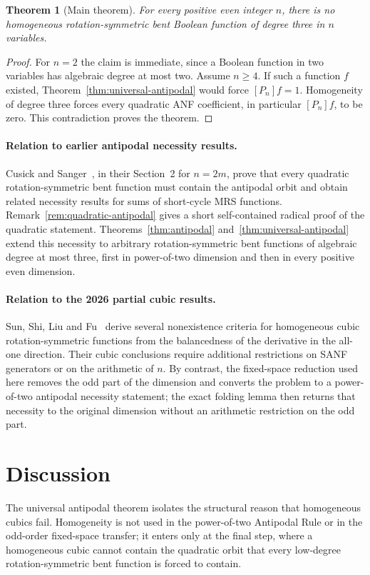 \documentclass[11pt,a4paper]{article}
\newtheorem{theorem}{Theorem}[section]
\theoremstyle{remark}
\theoremstyle{plain}
\begin{document}
\begin{theorem}[Main theorem]\label{thm:global}
For every positive even integer $n$, there is no homogeneous rotation-symmetric bent Boolean function of degree three in $n$ variables.
\end{theorem}
\begin{proof}
For $n=2$ the claim is immediate, since a Boolean function in two variables has algebraic degree at most two. Assume $n\ge4$. If such a function $f$ existed, Theorem~\ref{thm:universal-antipodal} would force $[P_n]f=1$. Homogeneity of degree three forces every quadratic ANF coefficient, in particular $[P_n]f$, to be zero. This contradiction proves the theorem.
\end{proof}

\paragraph{Relation to earlier antipodal necessity results.}
Cusick and Sanger~\cite{cusick}, in their Section~2 for $n=2m$, prove that every quadratic rotation-symmetric bent function must contain the antipodal orbit and obtain related necessity results for sums of short-cycle MRS functions. Remark~\ref{rem:quadratic-antipodal} gives a short self-contained radical proof of the quadratic statement. Theorems~\ref{thm:antipodal} and~\ref{thm:universal-antipodal} extend this necessity to arbitrary rotation-symmetric bent functions of algebraic degree at most three, first in power-of-two dimension and then in every positive even dimension.

\paragraph{Relation to the 2026 partial cubic results.}
Sun, Shi, Liu and Fu~\cite{sun} derive several nonexistence criteria for homogeneous cubic rotation-symmetric functions from the balancedness of the derivative in the all-one direction. Their cubic conclusions require additional restrictions on SANF generators or on the arithmetic of $n$. By contrast, the fixed-space reduction used here removes the odd part of the dimension and converts the problem to a power-of-two antipodal necessity statement; the exact folding lemma then returns that necessity to the original dimension without an arithmetic restriction on the odd part.

\section{Discussion}
The universal antipodal theorem isolates the structural reason that homogeneous cubics fail. Homogeneity is not used in the power-of-two Antipodal Rule or in the odd-order fixed-space transfer; it enters only at the final step, where a homogeneous cubic cannot contain the quadratic orbit that every low-degree rotation-symmetric bent function is forced to contain.
\end{document}
